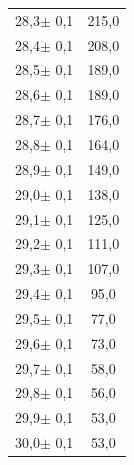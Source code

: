 \documentclass[titlepage = firstcover]{scrartcl}
\begin{document}
\begin{table}
\begin{tabular} {c c}
                28,3$\pm$ 0,1 & 	215,0   \\
                28,4$\pm$ 0,1 & 	208,0   \\
                28,5$\pm$ 0,1 & 	189,0   \\
                28,6$\pm$ 0,1 & 	189,0   \\
                28,7$\pm$ 0,1 & 	176,0   \\
                28,8$\pm$ 0,1 & 	164,0   \\
                28,9$\pm$ 0,1 & 	149,0   \\
                29,0$\pm$ 0,1 & 	138,0   \\
                29,1$\pm$ 0,1 & 	125,0   \\
                29,2$\pm$ 0,1 & 	111,0   \\
                29,3$\pm$ 0,1 & 	107,0   \\
                29,4$\pm$ 0,1 & 	95,0    \\
                29,5$\pm$ 0,1 & 	77,0    \\
                29,6$\pm$ 0,1 & 	73,0    \\
                29,7$\pm$ 0,1 & 	58,0    \\
                29,8$\pm$ 0,1 & 	56,0    \\
                29,9$\pm$ 0,1 & 	53,0    \\
                30,0$\pm$ 0,1 & 	53,0    \\
                \bottomrule  
              \end{tabular}
            \end{table}
            \FloatBarrier

            \newpage
\end{document}
